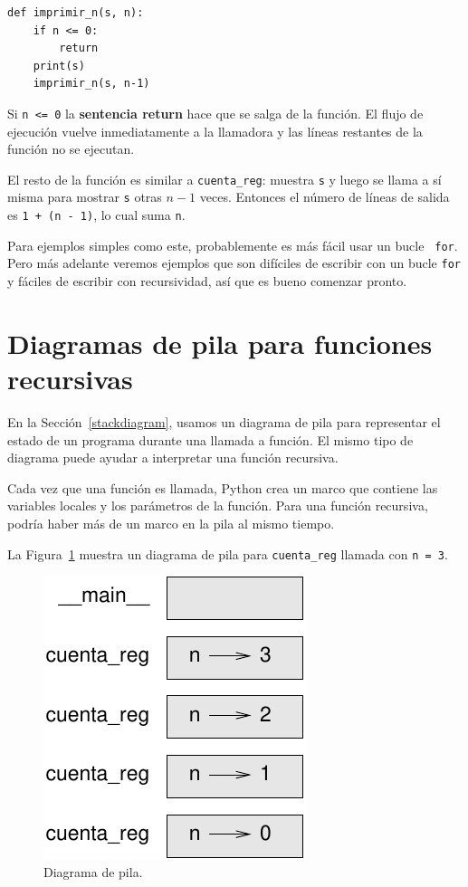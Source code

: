\documentclass[10pt]{book}
\begin{document}
\begin{verbatim}
def imprimir_n(s, n):
    if n <= 0:
        return
    print(s)
    imprimir_n(s, n-1)
\end{verbatim}
%
Si {\tt n <= 0} la {\bf sentencia return} hace que se salga de la función.  El
flujo de ejecución vuelve inmediatamente a la llamadora y las líneas restantes
de la función no se ejecutan.

El resto de la función es similar a {\tt cuenta\_reg}: muestra
{\tt s} y luego se llama a sí misma para mostrar {\tt s} otras $n-1$
veces.  Entonces el número de líneas de salida es {\tt 1 + (n - 1)}, lo cual
suma {\tt n}.

Para ejemplos simples como este, probablemente es más fácil usar un bucle {\tt
for}.  Pero más adelante veremos ejemplos que son difíciles de escribir
con un bucle {\tt for} y fáciles de escribir con recursividad, así que es
bueno comenzar pronto.


\section{Diagramas de pila para funciones recursivas}
\label{recursive.stack}

En la Sección~\ref{stackdiagram}, usamos un diagrama de pila para representar
el estado de un programa durante una llamada a función.  El mismo tipo de
diagrama puede ayudar a interpretar una función recursiva.

Cada vez que una función es llamada, Python crea un
marco que contiene las variables locales y los parámetros de la función.
Para una función recursiva, podría haber más de un marco en la
pila al mismo tiempo.

La Figura~\ref{fig.stack2} muestra un diagrama de pila para {\tt cuenta\_reg} llamada con
{\tt n = 3}.

\begin{figure}
\centerline
{\includegraphics[scale=0.8]{figs/stack2.pdf}}
\caption{Diagrama de pila.}
\label{fig.stack2}
\end{figure}
\end{document}
